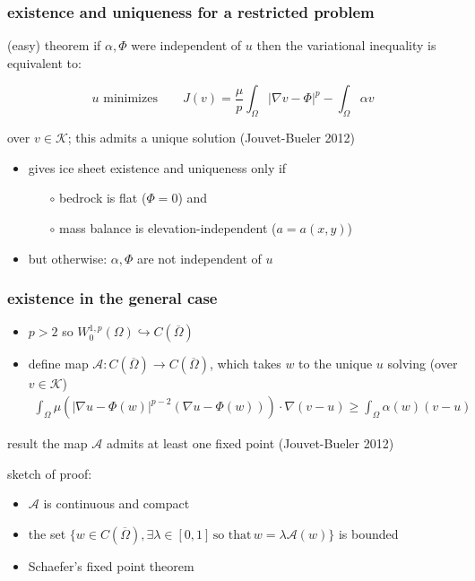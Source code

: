 \documentclass{beamer}
\begin{document}
\begin{frame}
  \frametitle{existence and uniqueness for a restricted problem} 

\begin{block}{(easy) theorem}
if $\alpha,\Phi$ were independent of $u$ then the variational inequality is equivalent to:

\begin{equation*}
u \text{ minimizes} \qquad J(v) = \frac{\mu}{p} \int_{\Omega} |\nabla v - \Phi |^p - \int_{\Omega}  \alpha v
\end{equation*}

over $v\in\mathcal{K}$; this admits a unique solution \hfill \scriptsize (Jouvet-Bueler 2012)
\end{block}

\bigskip
\begin{itemize}
\item gives ice sheet existence and uniqueness only if
  \begin{itemize}
  \item[$\circ$]  bedrock is flat ($\Phi = 0$) and
  \item[$\circ$]  mass balance is elevation-independent ($a=a(x,y)$)
  \end{itemize}
\item but otherwise: $\alpha,\Phi$ are not independent of $u$
\end{itemize}
\end{frame}
 

\begin{frame} 
  \frametitle{ existence in the general case } 

\begin{itemize}
\item $p>2$ so $W^{1,p}_0 (\Omega) \hookrightarrow C(\overline{\Omega})$
\item define map $\mathcal{A}:C(\overline{\Omega}) \rightarrow C(\overline{\Omega})$,
which takes $w$ to the unique $u$ solving (over $v\in \mathcal{K}$)
\begin{align*}
\int_{\Omega}   \mu  \left( | \nabla u - \Phi(w) |^{p-2} 
( \nabla u - \Phi(w) )    \right)  \cdot \nabla ( v - u )  
\ge \int_{\Omega} \alpha(w) (  v -  u )
\end{align*}
\end{itemize}

\begin{block}{result}
the map $\mathcal{A}$ admits at least one fixed point \hfill \scriptsize (Jouvet-Bueler 2012)
\end{block}

\vfill
\scriptsize
sketch of proof:
\begin{itemize}
\item $\mathcal{A}$ is continuous and compact
\item the set $\{ w \in C(\overline{\Omega}), \exists \lambda \in [0,1]\, \text{so that} \,w = \lambda \mathcal{A}(w)\}$ is bounded 
\item Schaefer's fixed point theorem
\end{itemize}
\end{frame}
\end{document}
